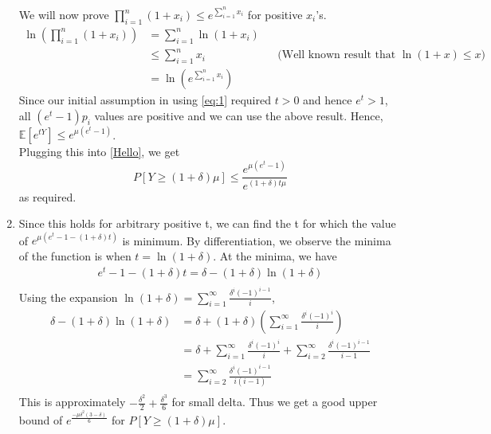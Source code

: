 \begin{enumerate}
    We will now prove $\prod_{i=1}^n (1+x_i) \le e^{\sum_{i=1}^n x_i}$ for positive $x_i$'s.
    \begin{align*}
        \ln\left(\prod_{i=1}^n (1+x_i)\right)&=\sum_{i=1}^n \ln(1+x_i)\\
        &\le \sum_{i=1}^n x_i && \text{(Well known result that $\ln(1+x)\le x$)}\\
        &= \ln\left(e^{\sum_{i=1}^n x_i}\right)
    \end{align*}
    Since our initial assumption in using \ref{eq:1} required $t>0$ and hence $e^t > 1$, all $(e^t-1)p_i$ values are positive and we can use the above result.
    Hence, $\mathbb{E}[e^{tY}] \le e^{\mu (e^t-1)}$.\\
    Plugging this into \ref{Hello}, we get
    \[
        P[Y\ge (1+\delta)\mu]\le \frac{e^{\mu(e^t-1)}}{e^{(1+\delta)t\mu}}
    \]
    as required.\\
    \item Since this holds for arbitrary positive t, we can find the t for which the value of $e^{\mu (e^t-1-(1+\delta)t)}$ is minimum. By differentiation, we observe the minima of the function is when $t=\ln(1+\delta)$. At the minima, we have
    \begin{align*}
        e^t-1-(1+\delta)t = \delta-(1+\delta)\ln(1+\delta)\\
    \end{align*}
    Using the expansion $\ln(1+\delta)=\sum_{i=1}^{\infty}\frac{\delta^i(-1)^{i-1}}{i}$,
    \begin{align*}
        \delta - (1+\delta)\ln(1+\delta) &= \delta + (1+\delta)(\sum_{i=1}^{\infty}\frac{\delta^i(-1)^i}{i})\\
        &= \delta + \sum_{i=1}^{\infty}\frac{\delta^i(-1)^i}{i} + \sum_{i=2}^{\infty}\frac{\delta^{i}(-1)^{i-1}}{i-1}\\
        &= \sum_{i=2}^{\infty} \frac{\delta^i(-1)^{i-1}}{i(i-1)}\\
    \end{align*}
    This is approximately $-\frac{\delta^2}{2} + \frac{\delta^3}{6}$ for small delta. Thus we get a good upper bound of $e^{\frac{-\mu\delta^2(3-\delta)}{6}}$ for $P[Y\ge (1+\delta)\mu]$.\\

\end{enumerate}
